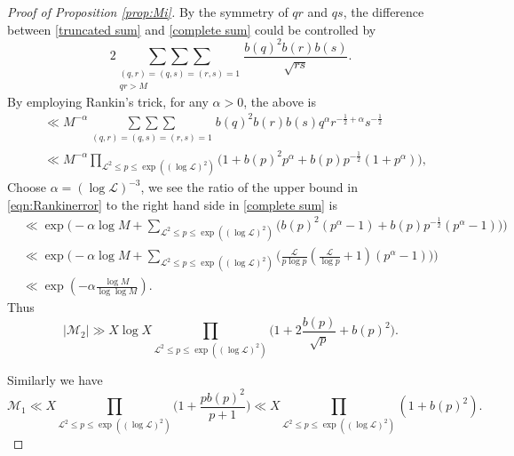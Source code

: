 \documentclass[10pt,a4paper]{amsart}
\begin{document}
\begin{proof}[Proof of Proposition \ref{prop:Mi}]
By the symmetry of $qr$ and $qs$, the difference between \eqref{truncated sum} and \eqref{complete sum} could be controlled by
  \begin{equation*}
2\underset{\substack{(q,r)=(q,s)=(r,s)=1
  \\qr> M}}
  {\sum\sum\sum}
  \frac{b(q)^2b(r)b(s)}{\sqrt{rs}}.
\end{equation*}
By employing Rankin's trick, for any $\alpha>0$, the above is
\begin{equation}\label{eqn:Rankinerror}
\begin{split}
 &\ll M^{-\alpha}\underset{
 \substack{(q,r)=(q,s)=(r,s)=1}}
  {\sum\sum\sum}b(q)^2 b(r)b(s)
  q^{\alpha}r^{-\frac{1}{2}+\alpha}
s^{-\frac{1}{2}}\\
&\ll M^{-\alpha}
\prod_{\mathcal{L}^2\leq p \leq \exp((\log \mathcal{L})^2)}
\Big(1+b(p)^2p^{\alpha}
  +b(p)p^{-\frac{1}{2}}(1+p^{\alpha})\Big),
\end{split}
\end{equation}
Choose $\alpha=(\log \mathcal{L})^{-3}$, we see the ratio of the upper bound in \eqref{eqn:Rankinerror} to the right hand side in \eqref{complete sum} is
\begin{equation*}\label{eqn:ratioerror}
\begin{split}
&\ll \exp\Bigg(
  -\alpha\log M+\sum_{\mathcal{L}^2\leq p\leq \exp((\log \mathcal{L})^2)}\Big(
 b(p)^2(p^{\alpha}-1)
 +b(p)p^{-\frac{1}{2}}(p^{\alpha}-1)
  \Big)
  \Bigg)\\
  &\ll \exp\Bigg(
  -\alpha\log M+\sum_{\mathcal{L}^2\leq p\leq \exp((\log \mathcal{L})^2)}\bigg(
  \frac{\mathcal{L}}{p\log p}(\frac{\mathcal{L}}{\log p}+1)(p^\alpha-1)
  \bigg)
  \Bigg)\\
     & \ll \exp(-\alpha\frac{\log M}{\log\log M}).
\end{split}
\end{equation*}
Thus
\begin{equation*}
   |\mathcal{M}_2|\gg
   X\log X \prod_{\mathcal{L}^2\leq p \leq \exp((\log \mathcal{L})^2)}
  \bigg(1+2\frac{b(p)}{\sqrt{p}}+b(p)^2\bigg).
\end{equation*}

Similarly we have
\begin{equation*}
  \mathcal{M}_1\ll X\prod_{\mathcal{L}^2\leq p \leq \exp((\log \mathcal{L})^2)}
\bigg(1+\frac{p b(p)^2}{p+1}\bigg)\ll X\prod_{\mathcal{L}^2\leq p \leq \exp((\log \mathcal{L})^2)}
(1+ b(p)^2).
\end{equation*}
\end{proof}
\end{document}

